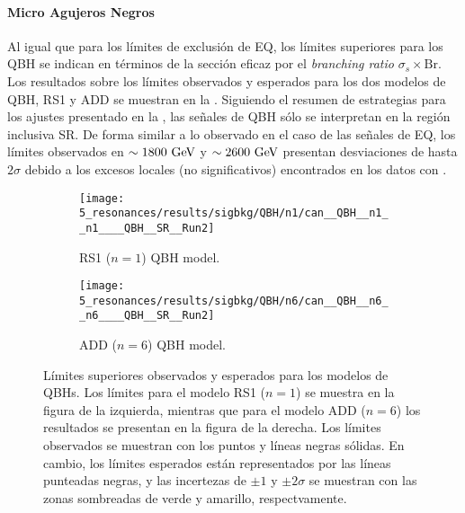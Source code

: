 \paragraph{Micro Agujeros Negros}
\label{paragraph:results:results:bkgsig:results:qbh}

Al igual que para los límites de exclusión de \ac{EQ}, los límites superiores para los \ac{QBH} se indican en términos de la sección eficaz por el \textit{branching ratio} \(\sigma_s \times \text{Br}\).
Los resultados sobre los límites observados y esperados para los dos modelos de \ac{QBH}, RS1 y ADD se muestran en la \Fig{\ref{fig:results:results:bkgsig:results:qbh:limits}}. Siguiendo el resumen de estrategias para los ajustes presentado en la \Tab{\ref{tab:bkg:modeling:strategy_modeling:summary}}, las señales de \ac{QBH} sólo se interpretan en la región inclusiva SR. De forma similar a lo observado en el caso de las señales de \ac{EQ}, los límites observados en \(\sim 1800~\text{GeV}\) y \(\sim 2600~\text{GeV}\) presentan desviaciones de hasta \(2\sigma\) debido a los excesos locales (no significativos) encontrados en los datos con \bh.

\begin{figure}[ht!]
    \centering
    \begin{subfigure}[h]{0.49\linewidth}
        \centering
        \texttt{[image: 5\_resonances/results/sigbkg/QBH/n1/can\_\_QBH\_\_n1\_\_n1\_\_\_\_QBH\_\_SR\_\_Run2]}
        \caption{RS1 (\(n=1\)) \ac{QBH} model.}
    \end{subfigure}
    \hfill
    \begin{subfigure}[h]{0.49\linewidth}
        \centering
        \texttt{[image: 5\_resonances/results/sigbkg/QBH/n6/can\_\_QBH\_\_n6\_\_n6\_\_\_\_QBH\_\_SR\_\_Run2]}
        \caption{ADD (\(n=6\)) \ac{QBH} model.}
    \end{subfigure}
    \caption{Límites superiores observados y esperados para los modelos de \acp{QBH}. Los límites para el modelo RS1 (\(n=1\)) se muestra en la figura de la izquierda, mientras que para el modelo ADD (\(n=6\)) los resultados se presentan en la figura de la derecha. Los límites observados se muestran con los puntos y líneas negras sólidas. En cambio, los límites esperados están representados por las líneas punteadas negras, y las incertezas de \(\pm 1\) y \(\pm 2 \sigma\) se muestran con las zonas sombreadas de verde y amarillo, respectvamente.}
    \label{fig:results:results:bkgsig:results:qbh:limits}
\end{figure}

